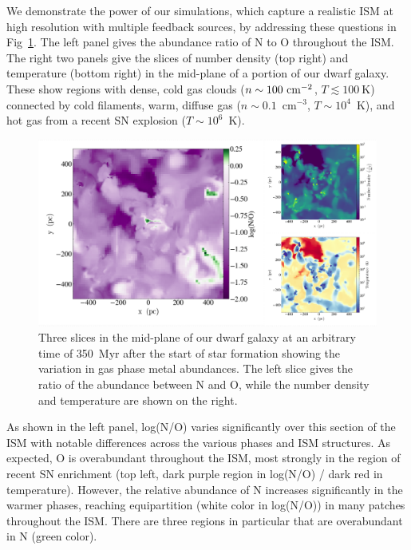 \documentclass[twocolumn]{aastex61}
\begin{document}
We demonstrate the power of our simulations, which capture a realistic ISM at high resolution with multiple feedback sources, by addressing these questions in Fig~\ref{fig:metal_slices}. The left panel gives the abundance ratio of N to O throughout the ISM. The right 
two panels give the slices of number density (top right) and temperature (bottom right) in the mid-plane of a portion of our dwarf galaxy. These show regions with dense, cold gas clouds ($n \sim 100~\rm{cm}^{-2}$, $T \lesssim 100~$K) connected by cold filaments, warm, diffuse gas ($n\sim 0.1$~cm$^{-3}$, $T\sim 10^{4}$~K), and hot gas from a recent SN explosion ($T\sim10^{6}$~K). 


\begin{figure}
\includegraphics[width=0.98\linewidth]{log_NO_panel}
            \caption{Three slices in the mid-plane of our dwarf galaxy at an arbitrary time of 350~Myr after the start of star formation showing the variation in gas phase metal abundances. The left slice gives the ratio of the abundance between N and O, while the number density and temperature are shown on the right. }
\label{fig:metal_slices}
\end{figure}

As shown in the left panel, log(N/O) varies significantly over this section of the ISM with notable differences across the various phases and ISM structures. As expected, O is overabundant throughout the ISM, most strongly in the region of recent SN enrichment (top left, dark purple region in log(N/O) / dark red in temperature). However, the relative abundance of N increases significantly in the warmer phases, reaching equipartition (white color in log(N/O)) in many patches throughout the ISM. There are three regions in particular that are overabundant in N (green color). 
\end{document}
